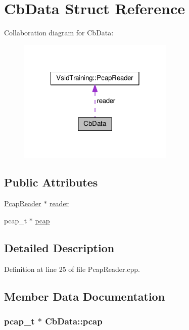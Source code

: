 \hypertarget{struct_cb_data}{\section{Cb\-Data Struct Reference}
\label{struct_cb_data}
}


Collaboration diagram for Cb\-Data\-:
\nopagebreak
\begin{figure}[H]
\begin{center}
\leavevmode
\includegraphics[width=210pt]{struct_cb_data__coll__graph}
\end{center}
\end{figure}
\subsection*{Public Attributes}
\begin{DoxyCompactItemize}
\item 
\hyperlink{class_vsid_pcap_classifier_1_1_pcap_reader}{Pcap\-Reader} $\ast$ \hyperlink{struct_cb_data_a5215d002d95223186527902c79ef42c3}{reader}
\item 
pcap\-\_\-t $\ast$ \hyperlink{struct_cb_data_acd84fb8416ac3909a80163719c662b96}{pcap}
\end{DoxyCompactItemize}


\subsection{Detailed Description}


Definition at line 25 of file Pcap\-Reader.\-cpp.



\subsection{Member Data Documentation}
\hypertarget{struct_cb_data_acd84fb8416ac3909a80163719c662b96}{
\subsubsection[{pcap}]{\setlength{\rightskip}{0pt plus 5cm}pcap\-\_\-t $\ast$ Cb\-Data\-::pcap}}\label{struct_cb_data_acd84fb8416ac3909a80163719c662b96}


